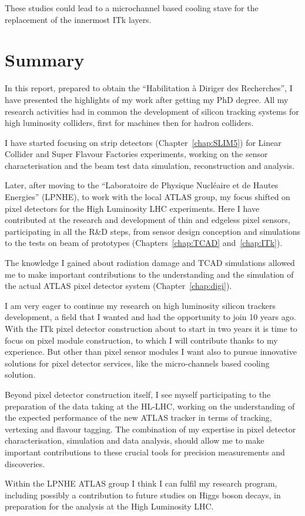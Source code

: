 These studies could lead to a microchannel based cooling stave for the replacement of the innermost 
ITk layers.

\chapter*{Summary}
In this report, prepared  to obtain the  ``Habilitation \`a Diriger des Recherches'', I have 
presented the highlights of my work  after getting my PhD degree. 
All my research activities had in common the development of silicon tracking systems for high luminosity 
colliders, first for \epem machines then for hadron colliders. 

I have started focusing on strip detectors (Chapter~\ref{chap:SLIM5}) for Linear Collider and Super 
Flavour Factories experiments,  working on the sensor characterisation and the beam test data simulation, 
reconstruction and analysis. 

Later, after moving to the  ``Laboratoire de Physique Nucl\'eaire et de Hautes Energies'' (LPNHE), to 
work with the local ATLAS group, my focus shifted on pixel detectors for the High Luminosity LHC 
experiments. Here I have contributed at the research and development of thin and edgeless 
pixel sensors, participating in all the R\&D steps, from sensor design conception and simulations to 
the tests on beam of prototypes (Chapters~\ref{chap:TCAD} and~\ref{chap:ITk}). 

The knowledge I gained about radiation damage and TCAD simulations allowed me to make important 
contributions to the understanding and the simulation of the actual ATLAS pixel detector system 
(Chapter~\ref{chap:digi}). 

I am very eager to continue my research on high luminosity silicon trackers development, 
a field that I wanted and had the opportunity to join 10 years ago. 
With the ITk pixel detector construction about to start in two years it is time to focus on pixel 
module construction, to which I will contribute thanks to my experience. But other than 
pixel sensor modules I want also to pursue innovative solutions for pixel detector services, 
like the micro-channels based cooling solution.

Beyond pixel detector construction itself, I see myself participating to the preparation of the 
data taking at the HL-LHC, working on the understanding of the expected performance of the 
new ATLAS tracker in terms of tracking, vertexing and flavour tagging. The combination of my 
expertise in pixel detector characterisation, simulation and data analysis, should allow me 
to make important contributions to these crucial tools for precision measurements and discoveries. 

Within the LPNHE ATLAS group I think I can fulfil my research program, including possibly 
a contribution to future studies on Higgs boson decays, in preparation for the analysis 
at the High Luminosity LHC.

